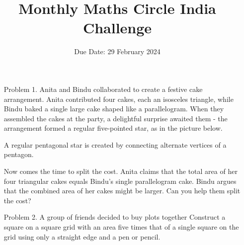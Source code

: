 \documentclass[a4paper,12pt]{article}
\title{Monthly Maths Circle India Challenge}
\date{Due Date: 29 February 2024}
\begin{document}
\maketitle
\begin{enumerate}
    \item[Problem 1.] Anita and Bindu collaborated to create a festive cake arrangement. Anita contributed four cakes, each an isosceles triangle, while Bindu baked a single large cake shaped like a parallelogram. When they assembled the cakes at the party, a delightful surprise awaited them - the arrangement formed a regular five-pointed star, as in the picture below.
    \begin{figure}[h]
        \centering
                        
    \end{figure}

    A regular pentagonal star is created by connecting alternate vertices of a pentagon.

    Now comes the time to split the cost. Anita claims that the total area of her four triangular cakes equals Bindu's single parallelogram cake. Bindu argues that the combined area of her cakes might be larger. Can you help them split the cost?

    
    \item[Problem 2.] A group of friends decided to buy plots together
    Construct a square on a square grid with an area five times that of a single square on the grid using only a straight edge and a pen or pencil.
    \begin{figure}[h]
        \centering
        
    \end{figure}
\end{enumerate}
\end{document}
